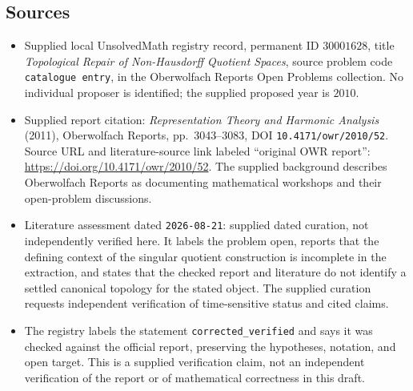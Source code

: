 \documentclass[11pt]{article}
\begin{document}
\subsection{Sources}
\begin{itemize}
\item Supplied local UnsolvedMath registry record, permanent ID \(30001628\), title \emph{Topological Repair of Non-Hausdorff Quotient Spaces}, source problem code \texttt{catalogue entry}, in the Oberwolfach Reports Open Problems collection. No individual proposer is identified; the supplied proposed year is \(2010\).
\item Supplied report citation: \emph{Representation Theory and Harmonic Analysis} (2011), Oberwolfach Reports, pp.\ 3043--3083, DOI \texttt{10.4171/owr/2010/52}. Source URL and literature-source link labeled ``original OWR report'': \url{https://doi.org/10.4171/owr/2010/52}. The supplied background describes Oberwolfach Reports as documenting mathematical workshops and their open-problem discussions.
\item Literature assessment dated \texttt{2026-08-21}: supplied dated curation, not independently verified here. It labels the problem open, reports that the defining context of the singular quotient construction is incomplete in the extraction, and states that the checked report and literature do not identify a settled canonical topology for the stated object. The supplied curation requests independent verification of time-sensitive status and cited claims.
\item The registry labels the statement \texttt{corrected\_verified} and says it was checked against the official report, preserving the hypotheses, notation, and open target. This is a supplied verification claim, not an independent verification of the report or of mathematical correctness in this draft.
\end{itemize}
\end{document}
